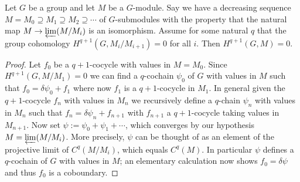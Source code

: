 


\begin{lemma}\label{lem:serre_approx}
	Let $G$ be a group and let $M$ be a $G$-module. Say we have
	a decreasing sequence $M=M_0\supseteq M_1\supseteq M_2\supseteq \cdots$
	of $G$-submodules with the property that the natural map $M\to\varprojlim(M/M_i)$
	is an isomorphism.
	Assume for some natural $q$ that the group cohomology $H^{q+1}(G,M_i/M_{i+1})=0$
	for all $i$. Then $H^{q+1}(G,M)=0.$
\end{lemma}
\begin{proof}
	Let $f_0$ be a $q+1$-cocycle with values in $M=M_0$. Since $H^{q+1}(G,M/M_1)=0$ we can
	find a $q$-cochain $\psi_0$ of $G$ with values in $M$ such that $f_0=\delta\psi_0+f_1$
	where now $f_1$ is a $q+1$-cocycle in $M_1$. In general given the $q+1$-cocycle $f_n$ with
	values in $M_n$ we recursively define a $q$-chain $\psi_n$ with values in $M_n$ such
	that $f_n=\delta\psi_n+f_{n+1}$
	with $f_{n+1}$ a $q+1$-cocycle taking values in $M_{n+1}$. Now set $\psi:=\psi_0+\psi_1+\cdots$,
	which converges by our hypothesis $M=\varprojlim(M/M_i)$. More precisely, $\psi$
	can be thought of as an element of the projective limit of $C^q(M/M_i)$, which
	equals $C^q(M)$. In particular $\psi$ defines a $q$-cochain of $G$
	with values in $M$; an elementary calculation now shows $f_0=\delta\psi$ and thus $f_0$ is
	a coboundary.
\end{proof}

